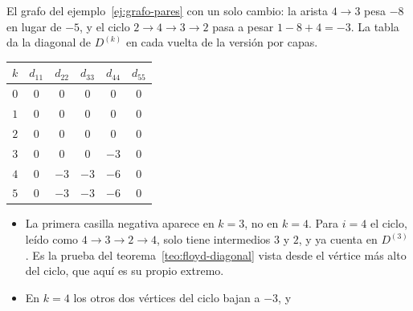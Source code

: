 \documentclass[11pt,letterpaper]{article}
\begin{document}
\begin{ejemplo}
  \label{ej:floyd-ciclo-negativo}
  El grafo del ejemplo~\ref{ej:grafo-pares} con un solo cambio: la
  arista $4 \to 3$ pesa $-8$ en lugar de $-5$, y el ciclo
  $2 \to 4 \to 3 \to 2$ pasa a pesar $1 - 8 + 4 = -3$. La tabla da la
  diagonal de $D^{(k)}$ en cada vuelta de la versión por capas.
  \begin{center}
  \hspace{1cm}
  \small
  \begin{tabular}{cccccc}
    \toprule
    $k$ & $d_{11}$ & $d_{22}$ & $d_{33}$ & $d_{44}$ & $d_{55}$ \\
    \midrule
    $0$ & $0$ & $0$ & $0$ & $0$ & $0$ \\
    $1$ & $0$ & $0$ & $0$ & $0$ & $0$ \\
    $2$ & $0$ & $0$ & $0$ & $0$ & $0$ \\
    $3$ & $0$ & $0$ & $0$ & $-3$ & $0$ \\
    $4$ & $0$ & $-3$ & $-3$ & $-6$ & $0$ \\
    $5$ & $0$ & $-3$ & $-3$ & $-6$ & $0$ \\
    \bottomrule
  \end{tabular}
  \end{center}
  \begin{itemize}[itemsep=0.1em]
    \item La primera casilla negativa aparece en $k = 3$, no en
          $k = 4$. Para $i = 4$ el ciclo, leído como
          $4 \to 3 \to 2 \to 4$, solo tiene intermedios $3$ y $2$, y ya
          cuenta en $D^{(3)}$. Es la prueba del
          teorema~\ref{teo:floyd-diagonal} vista desde el vértice más
          alto del ciclo, que aquí es su propio extremo.
    \item En $k = 4$ los otros dos vértices del ciclo bajan a $-3$, y

\end{itemize}
\end{ejemplo}
\end{document}
